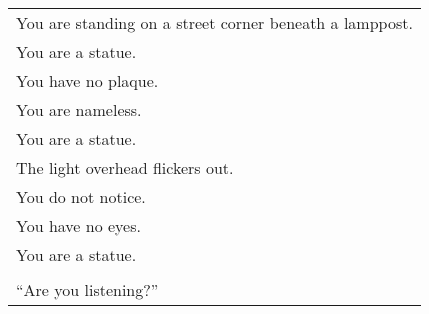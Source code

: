 \documentclass{article}
\begin{document}
\begin{center}
\begin{tabular}{l}
\\
You are standing on a street corner beneath a lamppost. \\
You are a statue. \\
You have no plaque. \\
You are nameless. \\
You are a statue. \\
The light overhead flickers out. \\
You do not notice. \\
You have no eyes. \\
You are a statue. \\
\\
``Are you listening?'' \\
\end{tabular}
\end{center}
\end{document}
